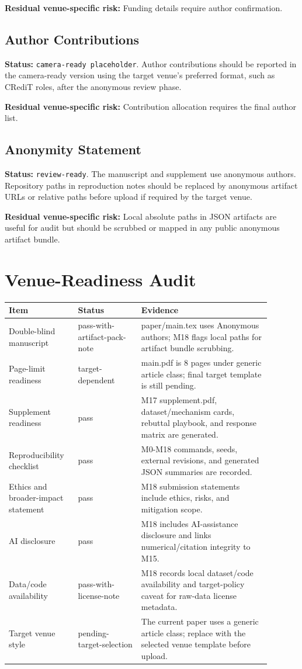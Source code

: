 \documentclass[10pt]{article}
\begin{document}
\textbf{Residual venue-specific risk:} Funding details require author confirmation.

\subsection{Author Contributions}
\textbf{Status:} \texttt{camera-ready placeholder}. Author contributions should be reported in the camera-ready version using the target venue's preferred format, such as CRediT roles, after the anonymous review phase.

\textbf{Residual venue-specific risk:} Contribution allocation requires the final author list.

\subsection{Anonymity Statement}
\textbf{Status:} \texttt{review-ready}. The manuscript and supplement use anonymous authors. Repository paths in reproduction notes should be replaced by anonymous artifact URLs or relative paths before upload if required by the target venue.

\textbf{Residual venue-specific risk:} Local absolute paths in JSON artifacts are useful for audit but should be scrubbed or mapped in any public anonymous artifact bundle.


\section{Venue-Readiness Audit}
\small
\begin{longtable}{p{0.22\linewidth}p{0.22\linewidth}p{0.45\linewidth}}
\toprule
Item & Status & Evidence\\
\midrule
Double-blind manuscript & pass-with-artifact-pack-note & paper/main.tex uses Anonymous authors; M18 flags local paths for artifact bundle scrubbing.\\
Page-limit readiness & target-dependent & main.pdf is 8 pages under generic article class; final target template is still pending.\\
Supplement readiness & pass & M17 supplement.pdf, dataset/mechanism cards, rebuttal playbook, and response matrix are generated.\\
Reproducibility checklist & pass & M0-M18 commands, seeds, external revisions, and generated JSON summaries are recorded.\\
Ethics and broader-impact statement & pass & M18 submission statements include ethics, risks, and mitigation scope.\\
AI disclosure & pass & M18 includes AI-assistance disclosure and links numerical/citation integrity to M15.\\
Data/code availability & pass-with-license-note & M18 records local dataset/code availability and target-policy caveat for raw-data license metadata.\\
Target venue style & pending-target-selection & The current paper uses a generic article class; replace with the selected venue template before upload.\\
\bottomrule
\end{longtable}
\normalsize
\end{document}
